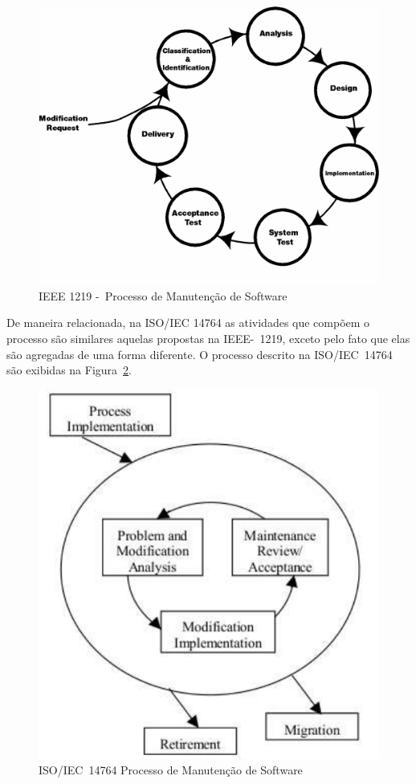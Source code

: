 \begin{figure}[htpb] \centering
	\includegraphics[width=0.7\linewidth]{./chapter-manutencao-software-visao-geral/img/ieee_1219_98_processo_manutencao.png}
	\caption{IEEE 1219 -~Processo de Manutenção de
		Software}\label{fig:ieee-1219-processo-man-software}
\end{figure}

De maneira relacionada, na ISO/IEC 14764 as atividades que compõem o processo
são similares aquelas propostas na IEEE-~1219, exceto pelo fato que elas são
agregadas de uma forma diferente. O processo descrito na ISO/IEC~14764 são
exibidas na Figura~\ref{fig:ieee-14764-processo-manutencao}.

\begin{figure}[htpb] \centering
	\includegraphics[width=0.7\linewidth]
{chapter-manutencao-software-visao-geral/img/ieee-14764-processo-manutencao.pdf}
	\caption{ISO/IEC~14764 Processo de Manutenção de Software}
\label{fig:ieee-14764-processo-manutencao} \end{figure}


